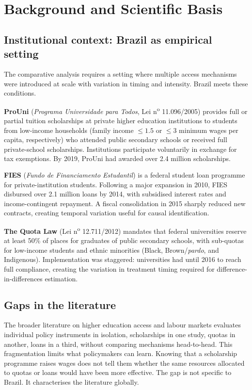 \documentclass[a4paper,11pt]{article}
\begin{document}
\section{Background and Scientific Basis}

\subsection{Institutional context: Brazil as empirical setting}

The comparative analysis requires a setting where multiple access mechanisms were introduced at scale with variation in timing and intensity. Brazil meets these conditions.

\textbf{ProUni} (\textit{Programa Universidade para Todos}, Lei n\textsuperscript{o} 11.096/2005) provides full or partial tuition scholarships at private higher education institutions to students from low-income households (family income $\leq 1.5$ or $\leq 3$ minimum wages per capita, respectively) who attended public secondary schools or received full private-school scholarships. Institutions participate voluntarily in exchange for tax exemptions. By 2019, ProUni had awarded over 2.4 million scholarships.

\textbf{FIES} (\textit{Fundo de Financiamento Estudantil}) is a federal student loan programme for private-institution students. Following a major expansion in 2010, FIES disbursed over 2.1 million loans by 2014, with subsidised interest rates and income-contingent repayment. A fiscal consolidation in 2015 sharply reduced new contracts, creating temporal variation useful for causal identification.

\textbf{The Quota Law} (Lei n\textsuperscript{o} 12.711/2012) mandates that federal universities reserve at least 50\% of places for graduates of public secondary schools, with sub-quotas for low-income students and ethnic minorities (Black, Brown/\textit{pardo}, and Indigenous). Implementation was staggered: universities had until 2016 to reach full compliance, creating the variation in treatment timing required for difference-in-differences estimation.

\subsection{Gaps in the literature}

The broader literature on higher education access and labour markets evaluates individual policy instruments in isolation, scholarships in one study, quotas in another, loans in a third, without comparing mechanisms head-to-head. This fragmentation limits what policymakers can learn. Knowing that a scholarship programme raises wages does not tell them whether the same resources allocated to quotas or loans would have been more effective. The gap is not specific to Brazil. It characterises the literature globally.
\end{document}

